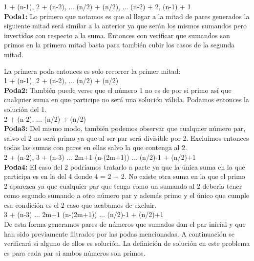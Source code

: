 \documentclass[11pt, a4paper, spanish]{article}
\begin{document}
	1 + (n-1),
	2 + (n-2),
	...
	(n/2) + (n/2),
	...
	(n-2) + 2,
	(n-1) + 1\\
	
	\textbf{Poda1:} Lo primero que notamos es que al llegar a la mitad de pares generados la siguiente mitad ser\'a
	similar a la anterior ya que ser\'an los mismos sumandos pero invertidos con respecto a la suma.
	Entonces con verificar que sumandos son primos en la primera mitad basta para tambi\'en cubir los casos de la segunda mitad.
	
	La primera poda entonces es solo recorrer la primer mitad:\\
	
	1 + (n-1),
	2 + (n-2),
	...
	(n/2) + (n/2)\\
	
	\textbf{Poda2:} Tambi\'en puede verse que el n\'umero 1 no es de por si primo as\'i que cualquier suma en que participe no ser\'a una soluci\'on v\'alida. Podamos entonces la soluci\'on del 1.\\
	
	2 + (n-2),
	...
	(n/2) + (n/2)\\
	
	\textbf{Poda3:} Del mismo modo, tambi\'en podemos observar que cualquier n\'umero par, salvo el 2 no ser\'a primo ya que al ser par ser\'a divisible por 2. Excluimos entonces todas las sumas con pares en ellas salvo la que contenga al 2.\\
	
	2 + (n-2),
	3 + (n-3)
	...
	2m+1 (n-(2m+1))
	...
	(n/2)-1 + (n/2)+1\\
	
	\textbf{Poda4:} El caso del 2 podr\'iamos tratarlo a parte ya que la \'unica suma en la que participa es en la del 4 donde 4 = 2 + 2. No existe otra suma en la que el primo 2 aparezca ya que cualquier par que tenga como un sumando al 2 deberia tener como segundo sumando a otro n\'umero par y adem\'as primo y el \'unico que cumple esa condici\'on es el 2 caso que acabamos de excluir.\\
		
	3 + (n-3)
	...
	2m+1 (n-(2m+1))
	...
	(n/2)-1 + (n/2)+1\\	
	
	De esta forma generamos pares de n\'umeros que sumados dan el par inicial y que han sido previamente filtrados por las podas mencionadas. A continuaci\'on se verificar\'a si alguno de ellos es soluci\'on. La definici\'on de soluci\'on en este problema es para cada par si ambos n\'umeros son primos.
	
\end{document}
